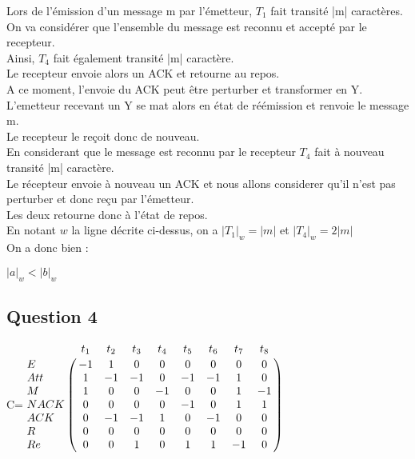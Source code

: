 Lors de l'émission d'un message m par l'émetteur, $T_1$ fait transité |m| caractères.\\
On va considérer que l'ensemble du message est reconnu et accepté par le recepteur.\\
Ainsi, $T_4$ fait également transité |m| caractère.\\
Le recepteur envoie alors un ACK et retourne au repos.\\
A ce moment, l'envoie du ACK peut être perturber et transformer en Y. L'emetteur recevant un Y se mat alors en état de réémission et renvoie le message m.\\
Le recepteur le reçoit donc de nouveau.\\
En considerant que le message est reconnu par le recepteur $T_4$ fait à nouveau transité |m| caractère.\\
Le récepteur envoie à nouveau un ACK et nous allons considerer qu'il n'est pas perturber et donc reçu par l'émetteur.\\
Les deux retourne donc à l'état de repos.\\

En notant $w$ la ligne décrite ci-dessus, on a $|T_1|_w = |m|$ et $|T_4|_w = 2|m|$\\
On a donc bien :
\begin{center}
  $|a|_w < |b|_w$
\end{center}

\subsection{Question 4}

\vspace{1cm}

\begin{center}

{\Huge C}\qquad =\qquad $\bordermatrix{
    &t_1 &t_2 &t_3 &t_4 &t_5 &t_6 &t_7 &t_8\cr
E   & -1& 1 & 0 & 0 & 0 & 0 & 0 & 0\cr
Att & 1 &-1 &-1 & 0 &-1 &-1 & 1 & 0\cr
M   & 1 & 0 & 0 &-1 & 0 & 0 & 1 &-1\cr
NACK& 0 & 0 & 0 & 0 &-1 & 0 & 1 & 1\cr
ACK & 0 &-1 &-1 & 1 & 0 &-1 & 0 & 0\cr
R   & 0 & 0 & 0 & 0 & 0 & 0 & 0 & 0\cr
Re  & 0 & 0 & 1 & 0 & 1 & 1 &-1 & 0\cr
}$

\end{center}



